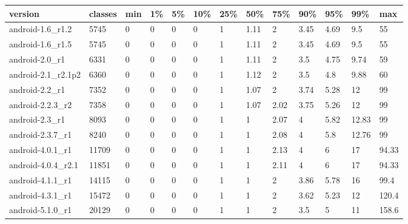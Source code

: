 \begin{tabular}{|l|l|l|l|l|l|l|l|l|l|l|l|l|}
\hline
version&classes&min&1\%&5\%&10\%&25\%&50\%&75\%&90\%&95\%&99\%&max\\
\hline
android-1.6\_r1.2&5745&0&0&0&0&1&1.11&2&3.45&4.69&9.5&55\\
\hline
android-1.6\_r1.5&5745&0&0&0&0&1&1.11&2&3.45&4.69&9.5&55\\
\hline
android-2.0\_r1&6331&0&0&0&0&1&1.11&2&3.5&4.75&9.74&59\\
\hline
android-2.1\_r2.1p2&6360&0&0&0&0&1&1.12&2&3.5&4.8&9.88&60\\
\hline
android-2.2\_r1&7352&0&0&0&0&1&1.07&2&3.74&5.28&12&99\\
\hline
android-2.2.3\_r2&7358&0&0&0&0&1&1.07&2.02&3.75&5.26&12&99\\
\hline
android-2.3\_r1&8093&0&0&0&0&1&1&2.07&4&5.82&12.83&99\\
\hline
android-2.3.7\_r1&8240&0&0&0&0&1&1&2.08&4&5.8&12.76&99\\
\hline
android-4.0.1\_r1&11709&0&0&0&0&1&1&2.13&4&6&17&94.33\\
\hline
android-4.0.4\_r2.1&11851&0&0&0&0&1&1&2.11&4&6&17&94.33\\
\hline
android-4.1.1\_r1&14115&0&0&0&0&1&1&2&3.86&5.78&16&99.4\\
\hline
android-4.3.1\_r1&15472&0&0&0&0&1&1&2&3.62&5.23&12&120.4\\
\hline
android-5.1.0\_r1&20129&0&0&0&0&1&1&2&3.5&5&11&158.6\\
\hline
\end{tabular}
